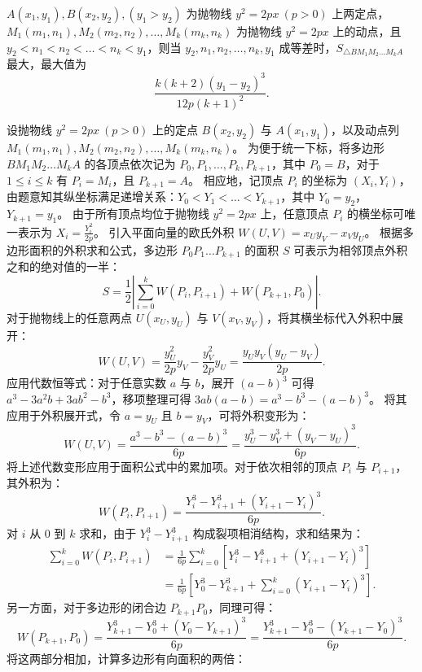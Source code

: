 \begin{example}
\(A(x_1,y_1), B(x_2,y_2), (y_1>y_2)\) 为抛物线 \(y^2 = 2px\ (p>0)\) 上两定点，\(M_1(m_1,n_1), M_2(m_2,n_2),\dots,M_k(m_k,n_k)\) 为抛物线 \(y^2 = 2px\) 上的动点，且 \(y_2 < n_1 < n_2 < \dots < n_k < y_1\)，则当 \(y_2,n_1,n_2,\dots,n_k,y_1\) 成等差时，\(S_{\triangle BM_1M_2\dots M_kA}\) 最大，最大值为
\[
\frac{k(k+2)(y_1-y_2)^3}{12p(k+1)^2}.
\]
\end{example}
\begin{solution}
设抛物线 $y^2 = 2px \ (p>0)$ 上的定点 $B(x_2, y_2)$ 与 $A(x_1, y_1)$，以及动点列 $M_1(m_1, n_1), M_2(m_2, n_2), \dots, M_k(m_k, n_k)$。
为便于统一下标，将多边形 $BM_1M_2\dots M_kA$ 的各顶点依次记为 $P_0, P_1, \dots, P_k, P_{k+1}$，其中 $P_0 = B$，对于 $1 \le i \le k$ 有 $P_i = M_i$，且 $P_{k+1} = A$。
相应地，记顶点 $P_i$ 的坐标为 $(X_i, Y_i)$，由题意知其纵坐标满足递增关系：$Y_0 < Y_1 < \dots < Y_{k+1}$，其中 $Y_0 = y_2$，$Y_{k+1} = y_1$。
由于所有顶点均位于抛物线 $y^2 = 2px$ 上，任意顶点 $P_i$ 的横坐标可唯一表示为 $X_i = \frac{Y_i^2}{2p}$。
引入平面向量的欧氏外积 $W(U, V) = x_U y_V - x_V y_U$。
根据多边形面积的外积求和公式，多边形 $P_0 P_1 \dots P_{k+1}$ 的面积 $S$ 可表示为相邻顶点外积之和的绝对值的一半：
\[ S = \frac{1}{2} \left| \sum_{i=0}^k W(P_i, P_{i+1}) + W(P_{k+1}, P_0) \right|. \]
对于抛物线上的任意两点 $U(x_U, y_U)$ 与 $V(x_V, y_V)$，将其横坐标代入外积中展开：
\[ W(U, V) = \frac{y_U^2}{2p} y_V - \frac{y_V^2}{2p} y_U = \frac{y_U y_V (y_U - y_V)}{2p}. \]
应用代数恒等式：对于任意实数 $a$ 与 $b$，展开 $(a-b)^3$ 可得 $a^3 - 3a^2b + 3ab^2 - b^3$，移项整理可得 $3ab(a-b) = a^3 - b^3 - (a-b)^3$。
将其应用于外积展开式，令 $a=y_U$ 且 $b=y_V$，可将外积变形为：
\[ W(U, V) = \frac{a^3 - b^3 - (a-b)^3}{6p} = \frac{y_U^3 - y_V^3 + (y_V - y_U)^3}{6p}. \]
将上述代数变形应用于面积公式中的累加项。对于依次相邻的顶点 $P_i$ 与 $P_{i+1}$，其外积为：
\[ W(P_i, P_{i+1}) = \frac{Y_i^3 - Y_{i+1}^3 + (Y_{i+1} - Y_i)^3}{6p}. \]
对 $i$ 从 $0$ 到 $k$ 求和，由于 $Y_i^3 - Y_{i+1}^3$ 构成裂项相消结构，求和结果为：
\begin{align*}
\sum_{i=0}^k W(P_i, P_{i+1}) &= \frac{1}{6p} \sum_{i=0}^k \left[ Y_i^3 - Y_{i+1}^3 + (Y_{i+1} - Y_i)^3 \right] \\
&= \frac{1}{6p} \left[ Y_0^3 - Y_{k+1}^3 + \sum_{i=0}^k (Y_{i+1} - Y_i)^3 \right].
\end{align*}
另一方面，对于多边形的闭合边 $P_{k+1}P_0$，同理可得：
\[ W(P_{k+1}, P_0) = \frac{Y_{k+1}^3 - Y_0^3 + (Y_0 - Y_{k+1})^3}{6p} = \frac{Y_{k+1}^3 - Y_0^3 - (Y_{k+1} - Y_0)^3}{6p}. \]
将这两部分相加，计算多边形有向面积的两倍：
\begin{align*}

\end{align*}
\end{solution}
